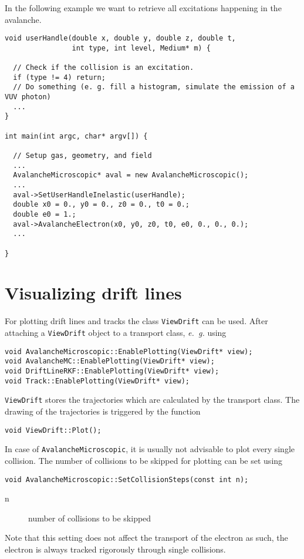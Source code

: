 In the following example we want to retrieve  
all excitations happening in the avalanche.
\begin{lstlisting}
void userHandle(double x, double y, double z, double t,
                int type, int level, Medium* m) {

  // Check if the collision is an excitation.
  if (type != 4) return;
  // Do something (e. g. fill a histogram, simulate the emission of a VUV photon) 
  ...
} 

int main(int argc, char* argv[]) {

  // Setup gas, geometry, and field
  ...
  AvalancheMicroscopic* aval = new AvalancheMicroscopic();
  ...
  aval->SetUserHandleInelastic(userHandle);
  double x0 = 0., y0 = 0., z0 = 0., t0 = 0.;
  double e0 = 1.;
  aval->AvalancheElectron(x0, y0, z0, t0, e0, 0., 0., 0.); 
  ...

}

\end{lstlisting}
 
\section{Visualizing drift lines}

For plotting drift lines and tracks the class \texttt{ViewDrift} can be used. 
After attaching a \texttt{ViewDrift} object to a transport class, 
\textit{e.~g.} using
\begin{lstlisting}
void AvalancheMicroscopic::EnablePlotting(ViewDrift* view);
void AvalancheMC::EnablePlotting(ViewDrift* view);
void DriftLineRKF::EnablePlotting(ViewDrift* view);
void Track::EnablePlotting(ViewDrift* view);
\end{lstlisting}
\texttt{ViewDrift} stores the trajectories which are calculated by the 
transport class. 
The drawing of the trajectories is triggered by the function
\begin{lstlisting}
void ViewDrift::Plot();
\end{lstlisting}

In case of \texttt{AvalancheMicroscopic}, it is usually not advisable to 
plot every single collision. The number of collisions 
to be skipped for plotting can be set using
\begin{lstlisting}
void AvalancheMicroscopic::SetCollisionSteps(const int n);
\end{lstlisting}
\begin{description}
  \item[n] number of collisions to be skipped
\end{description}
Note that this setting does not affect the transport of the electron as such, 
the electron is always tracked rigorously through single collisions.

